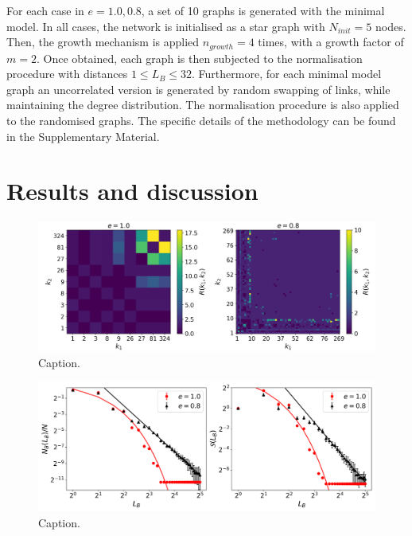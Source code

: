 For each case in $e=1.0, 0.8$, a set of 10 graphs is generated with the minimal model. In all cases, the network is initialised as a star graph with $N_{init}=5$ nodes. Then, the growth mechanism is applied $n_{growth}=4$ times, with a growth factor of $m=2$. Once obtained, each graph is then subjected to the normalisation procedure with distances $1\leq L_B\leq32$. Furthermore, for each minimal model graph an uncorrelated version is generated by random swapping of links, while maintaining the degree distribution. The normalisation procedure is also applied to the randomised graphs. The specific details of the methodology can be found in the Supplementary Material.



\section{Results and discussion}


\begin{figure}[!h]
	\begin{center}
	\includegraphics[scale=0.47]{./images/task_6/R_k1_k2_comparison.png} 
	\end{center}
	\caption{Caption.\\} 
	\label{fig:R_k1_k2_comparison} 
\end{figure}

\begin{figure}[!h]
	\begin{center}
	\includegraphics[scale=0.47]{./images/task_6/N_B_and_S_vs_L_B.png} 
	\end{center}
	\caption{Caption.\\} 
	\label{fig:N_B_and_S_vs_L_B} 
\end{figure}



\lipsum[2-4]


\newpage